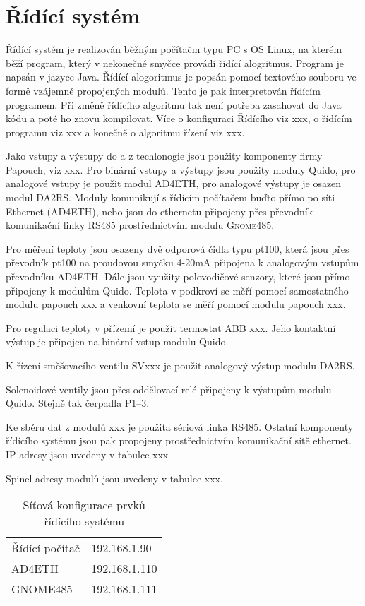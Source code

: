 \documentclass[a4paper,draft]{book}
\begin{document}
\chapter{Řídící systém}

    Řídící systém je realizován běžným počítačm typu PC s OS Linux, na kterém
    běží program, který v nekonečné smyčce provádí řídící alogritmus. Program
    je napsán v jazyce Java. Řídící alogoritmus je popsán pomocí textového
    souboru ve formě vzájemně propojených modulů. Tento je pak interpretován
    řídícím programem. Při změně řídícího algoritmu tak není potřeba zasahovat
    do Java kódu a poté ho znovu kompilovat. Více o konfiguraci Řídícího
    viz xxx, o řídícím programu viz xxx a konečně o algoritmu řízení viz xxx.

    Jako vstupy a výstupy do a z techlonogie jsou použity komponenty firmy
    Papouch, viz xxx. Pro binární vstupy a výstupy jsou použity moduly Quido,
    pro analogové vstupy je použit modul AD4ETH, pro analogové výstupy je
    osazen modul DA2RS. Moduly komunikují s řídícím počítačem buďto přímo
    po síti Ethernet (AD4ETH), nebo jsou do ethernetu připojeny přes převodník
    komunikační linky RS485 prostřednictvím modulu \textsc{Gnome485}.

    Pro měření teploty jsou osazeny dvě odporová čidla typu pt100, která jsou
    přes převodník pt100 na proudovou smyčku 4-20mA připojena k analogovým
    vstupům převodníku AD4ETH. Dále jsou využity polovodičové senzory, které
    jsou přímo připojeny k modulům Quido. Teplota v podkroví se měří pomocí
    samostatného modulu papouch xxx a venkovní teplota se měří pomocí modulu
    papouch xxx.

    Pro regulaci teploty v přízemí je použit termostat ABB xxx. Jeho kontaktní
    výstup je připojen na binární vstup modulu Quido.

    K řízení směšovacího ventilu SVxxx je použit analogový výstup modulu DA2RS.

    Solenoidové ventily jsou přes oddělovací relé připojeny k výstupům modulu
    Quido. Stejně tak čerpadla P1--3.

    Ke sběru dat z modulů xxx je použita sériová linka RS485. Ostatní komponenty
    řídícího systému jsou pak propojeny prostřednictvím komunikační sítě
    ethernet. IP adresy jsou uvedeny v tabulce xxx

    Spinel adresy modulů jsou uvedeny v tabulce xxx.

    \begin{table}
      \centering
      \begin{tabular}{ll}
        Řídící počítač & 192.168.1.90 \\
        AD4ETH         & 192.168.1.110\\
        GNOME485       & 192.168.1.111\\
      \end{tabular}
      \caption{Síťová konfigurace prvků řídícího systému}
    \end{table}
\end{document}
